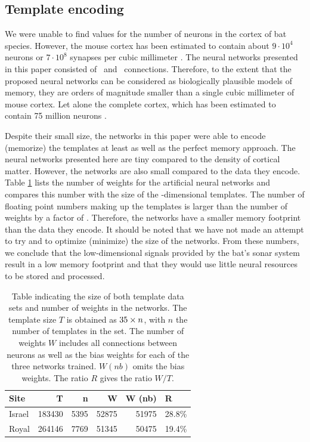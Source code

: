 \documentclass[preprint,5p]{elsarticle}
\begin{document}
\subsection{Template encoding}

We were unable to find values for the number of neurons in the cortex of bat species. However, the mouse cortex has been estimated to contain about $9 \cdot 10^4$ neurons or $7 \cdot 10^8$ synapses per cubic millimeter \citep{Braitenberg2013}. The neural networks presented in this paper consisted of \nneurons\ and \nweights\ connections. Therefore, to the extent that the proposed neural networks can be considered as biologically plausible models of memory, they are orders of magnitude smaller than a single cubic millimeter of mouse cortex. Let alone the complete cortex, which has been estimated to contain 75 million neurons \citep{Williams2000}. 

Despite their small size, the networks in this paper were able to encode (memorize) the templates at least as well as the perfect memory approach. The neural networks presented here are tiny compared to the density of cortical matter. However, the networks are also small compared to the data they encode. Table \ref{tab:sizes} lists the number of weights for the artificial neural networks and compares this number with the size of the \pca-dimensional templates. The number of floating point numbers making up the templates is larger than the number of weights by a factor of \Compression. Therefore, the networks have a smaller memory footprint than the data they encode. It should be noted that we have not made an attempt to try and to optimize (minimize) the size of the networks. From these numbers, we conclude that the low-dimensional signals provided by the bat's sonar system result in a low memory footprint and that they would use little neural resources to be stored and processed.

\begin{table}
	\centering
\begin{tabular}{lrrrrl}
	\toprule
	Site &       T &     n &      W &  W (nb) &      R \\
	\midrule
	Israel &  183430 &  5395 &  52875 &   51975 &  28.8\% \\
	Royal &  264146 &  7769 &  51345 &   50475 &  19.4\% \\
	\bottomrule
\end{tabular}
	\label{tab:sizes}
	\caption{Table indicating the size of both template data sets and number of weights in the networks. The template size $T$ is obtained as $35 \times n$, with $n$ the number of templates in the set. The number of weights $W$ includes all connections between neurons as well as the bias weights for each of the three networks trained. $W (nb)$ omits the bias weights. The ratio $R$ gives the ratio $W/T$.}
\end{table}
\end{document}
